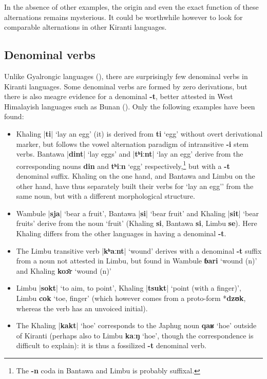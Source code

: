 \documentclass[oneside,a4paper,11pt]{article}
\newcommand{\ipa}[1]{\textbf{{\phon\mbox{#1}}}} %
\newcommand{\dhatu}[2]{|\ipa{#1}| `#2'}
\begin{document}

In the absence of other examples, the origin and even the exact function of these alternations remains mysterious. It could be worthwhile however to look for comparable alternations in other Kiranti languages.

\subsection{Denominal verbs} \label{sec:denom}
Unlike Gyalrongic languages (\citealt{jacques14antipassive}), there are surprisingly few denominal verbs in Kiranti languages. Some denominal verbs are formed by zero derivations, but there is also meagre evidence for a denominal \ipa{-t}, better attested in West Himalayish languages such as Bunan (\citealt[426]{widmer14bunan}). Only the following examples have been found:
\begin{itemize}
\item Khaling \dhatu{ti}{lay an egg} (it) is derived from \ipa{ti} `egg' without overt derivational marker, but follows the vowel alternation paradigm of intransitive \ipa{-i} stem verbs. Bantawa \dhatu{dint}{lay eggs} and \dhatu{tʰiːnt}{lay an egg} derive from the corresponding nouns  \ipa{din} and \ipa{tʰiːn} `egg' respectively,\footnote{The \ipa{-n} coda in Bantawa and Limbu is probably suffixal.} but with a \ipa{-t} denominal suffix. Khaling on the one hand, and Bantawa and Limbu on the other hand, have thus separately built their verbs for `lay an egg'' from the same noun, but with a different morphological structure.
\item Wambule \dhatu{sja}{bear a fruit}, Bantawa  \dhatu{si}{bear fruit} and Khaling \dhatu{sit}{bear fruits} derive from the noun `fruit' (Khaling \ipa{si},  Bantawa \ipa{si}, Limbu \ipa{se}). Here Khaling differs from the other languages in having a denominal \ipa{-t}.
 \item The Limbu transitive verb \dhatu{kʰaːnt}{wound} derives with a denominal \ipa{-t} suffix from a noun not attested in Limbu, but found in Wambule \ipa{ɓari} `wound (n)' and Khaling \ipa{koɔ̄r} `wound (n)'
 \item Limbu \dhatu{sokt}{to aim, to point}, Khaling \dhatu{tsukt}{point (with a finger)}, Limbu \ipa{cok} `toe, finger' (which however comes from a proto-form *\ipa{dzʊk}, whereas the verb has an unvoiced initial).
 \item The Khaling \dhatu{kakt}{hoe} corresponds to the Japhug noun \ipa{qaʁ} `hoe' outside of Kiranti (perhaps also to Limbu \ipa{kaːŋ} `hoe', though the correspondence is difficult to explain): it is thus a fossilized \ipa{-t} denominal verb.
\end{itemize}  
\end{document}
